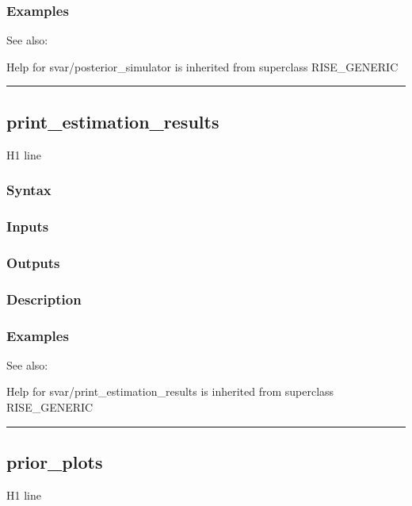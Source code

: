 \documentclass[letterpaper,10pt,english]{sphinxmanual}
\begin{document}
\subsubsection{Examples}
\label{classes/models/@svar/svar:id83}
See also:

Help for svar/posterior\_simulator is inherited from superclass RISE\_GENERIC


\bigskip\hrule{}\bigskip



\subsection{print\_estimation\_results}
\label{classes/models/@svar/svar:print-estimation-results}\label{classes/models/@svar/svar:id84}
H1 line


\subsubsection{Syntax}
\label{classes/models/@svar/svar:id85}

\subsubsection{Inputs}
\label{classes/models/@svar/svar:id86}

\subsubsection{Outputs}
\label{classes/models/@svar/svar:id87}

\subsubsection{Description}
\label{classes/models/@svar/svar:id88}

\subsubsection{Examples}
\label{classes/models/@svar/svar:id89}
See also:

Help for svar/print\_estimation\_results is inherited from superclass RISE\_GENERIC


\bigskip\hrule{}\bigskip



\subsection{prior\_plots}
\label{classes/models/@svar/svar:id90}\label{classes/models/@svar/svar:prior-plots}
H1 line
\end{document}
